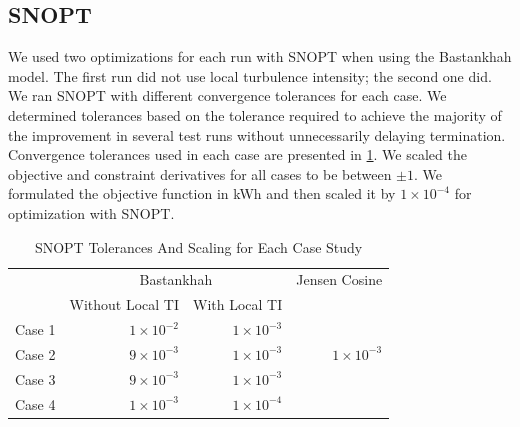 \documentclass[journal abbreviation, manuscript]{copernicus}
\begin{document}
	\subsection{SNOPT}
	We used two optimizations for each run with SNOPT when using the Bastankhah model. The first run did not use local turbulence intensity; the second one did. We ran SNOPT with different convergence tolerances for each case. We determined tolerances based on the tolerance required to achieve the majority of the improvement in several test runs without unnecessarily delaying termination. Convergence tolerances used in each case are presented in \ref{tab:snopttols}. We scaled the objective and constraint derivatives for all cases to be between $\pm1$. We formulated the objective function in kWh and then scaled it by $1\times10^{-4}$ for optimization with SNOPT.
	\begin{table}[h!]
		\centering
		\caption{SNOPT Tolerances And Scaling for Each Case Study}
		\label{tab:snopttols}
		\begin{tabular}{lrrr}
			\toprule
			{} & \multicolumn{2}{c}{Bastankhah } & Jensen Cosine \\
			\cmidrule(lr){2-3} \cmidrule(lr){4-4}
			& Without Local TI & With Local TI &  \\
			\cmidrule(lr){2-3} 
			Case 1 &  $1\times10^{-2}$ & $1\times10^{-3}$ & \\
			Case 2 & $9\times10^{-3}$ & $1\times10^{-3}$ & $1\times10^{-3}$ \\
			Case 3 & $9\times10^{-3}$ & $1\times10^{-3}$ & \\
			Case 4 &  $1\times10^{-3}$ & $1\times10^{-4}$ &  \\
			\bottomrule
		\end{tabular}
	\end{table}
	
\end{document}
